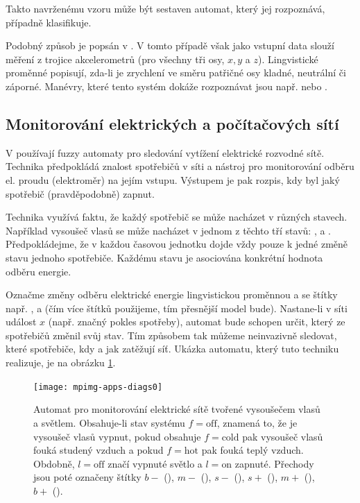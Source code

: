 Takto navrženému vzoru může být sestaven automat, který jej rozpoznává, případně klasifikuje.

Podobný způsob je popsán v \cite{Hul+-ManRecUsProFinStaMacFuzLog}. V tomto případě však jako vstupní data slouží měření z trojice akcelerometrů (pro všechny tři osy, $x, y$ a $z$). Lingvistické proměnné popisují, zda-li je zrychlení ve směru patřičné osy kladné, neutrální či záporné. Manévry, které tento systém dokáže rozpoznávat jsou např.  nebo .

\subsection{Monitorování elektrických a počítačových sítí} \label{subs:MonElComNet}
V \cite{DucMarMar-AlgBasFiStMacFuzTrNoIntrLoaDis} používají fuzzy automaty pro sledování vytížení elektrické rozvodné sítě. Technika předpokládá znalost spotřebičů v síti a nástroj pro monitorování odběru el. proudu (elektroměr) na jejím vstupu. Výstupem je pak rozpis, kdy byl jaký spotřebič (pravděpodobně) zapnut.

Technika využívá faktu, že každý spotřebič se může nacházet v různých stavech. Například vysoušeč vlasů se může nacházet v jednom z těchto tří stavů: ,  a . Předpokládejme, že v každou časovou jednotku dojde vždy pouze k jedné změně stavu jednoho spotřebiče. Každému stavu je asociována konkrétní hodnota odběru energie.

Označme změny odběru elektrické energie lingvistickou proměnnou  a se štítky např. ,  a  (čím více štítků použijeme, tím přesnější model bude). Nastane-li v síti událost $x$ (např. značný pokles spotřeby), automat bude schopen určit, který ze spotřebičů změnil svůj stav. Tím způsobem tak můžeme neinvazivně sledovat, které spotřebiče, kdy a jak zatěžují síť. Ukázka automatu, který tuto techniku realizuje, je na obrázku \ref{img:PowConsAut}.

\begin{figure}
 \centering
 \texttt{[image: mpimg-apps-diags0]}
 \caption[Automat pro monitorování elektrické sítě]{Automat pro monitorování elektrické sítě tvořené vysoušečem vlasů a světlem. Obsahuje-li stav systému $f = \text{off}$, znamená to, že je vysoušeč vlasů vypnut, pokud obsahuje $f = \text{cold}$ pak vysoušeč vlasů fouká studený vzduch a pokud $f = \text{hot}$ pak fouká teplý vzduch. Obdobně, $l = \text{off}$ značí vypnuté světlo a $l = \text{on}$ zapnuté. Přechody jsou poté označeny štítky $b-$ (), $m-$ (), $s-$ (), $s+$ (), $m+$ (), $b+$ ().}
 \label{img:PowConsAut}
\end{figure}


